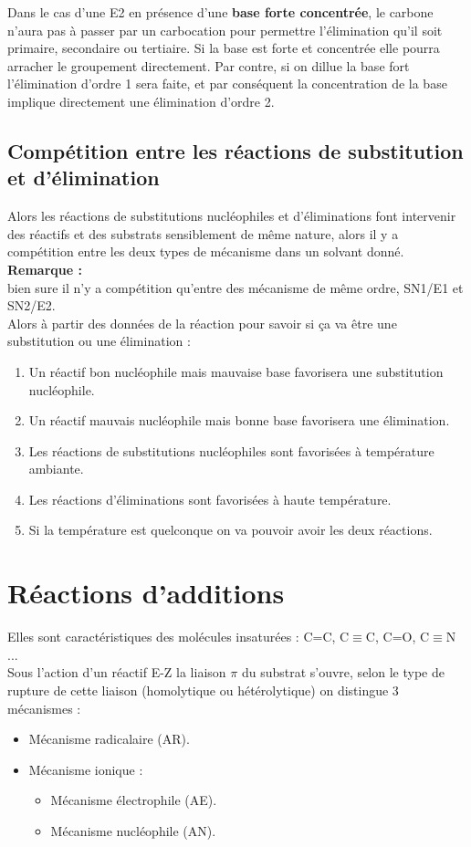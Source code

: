 \documentclass[a4paper, oneside]{book}
\begin{document}
Dans le cas d'une E2 en présence d'une \textbf{base forte concentrée}, le carbone n'aura pas à passer par un carbocation pour permettre l'élimination qu'il soit primaire, secondaire ou tertiaire. Si la base est forte et concentrée elle pourra arracher le groupement directement. 
Par contre, si on dillue la base fort l'élimination d'ordre 1 sera faite, et par conséquent la concentration de la base implique directement une élimination d'ordre 2.
\section{Compétition entre les réactions de substitution et d'élimination}
Alors les réactions de substitutions nucléophiles et d'éliminations font intervenir des réactifs et des substrats sensiblement de même nature, alors il y a compétition entre les deux types de mécanisme dans un solvant donné.\\
\textbf{Remarque :}\\
bien sure il n'y a compétition qu'entre des mécanisme de même ordre, SN1/E1 et SN2/E2.\\
Alors à partir des données de la réaction pour savoir si ça va être une substitution ou une élimination :
\begin{enumerate}
    \item Un réactif bon nucléophile mais mauvaise base favorisera une substitution nucléophile.
    \item Un réactif mauvais nucléophile mais bonne base favorisera une élimination.
    \item Les réactions de substitutions nucléophiles sont favorisées à température ambiante.
    \item Les réactions d'éliminations sont favorisées à haute température.
    \item Si la température est quelconque on va pouvoir avoir les deux réactions.
\end{enumerate}
\chapter{Réactions d'additions}
\minitoc
Elles sont caractéristiques des molécules insaturées : C=C, C$\equiv$C, C=O, C$\equiv$N ...\\
Sous l'action d'un réactif E-Z la liaison $\pi$ du substrat s'ouvre, selon le type de rupture de cette liaison (homolytique ou hétérolytique) on distingue 3 mécanismes : 
\begin{itemize}
    \item Mécanisme radicalaire (AR).
    \item Mécanisme ionique :
    \begin{itemize}
        \item Mécanisme électrophile (AE).
        \item Mécanisme nucléophile (AN).
    \end{itemize}
\end{itemize}
\end{document}
